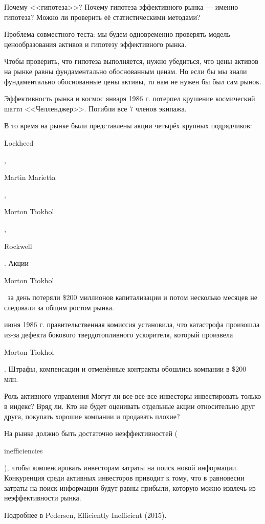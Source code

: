 \documentclass{beamer}
\newcommand{\en}[1]{\begin{otherlanguage}{english}#1\end{otherlanguage}}
\begin{document}
\begin{frame}{Почему <<гипотеза>>?}
\justify
Почему гипотеза эффективного рынка --- именно гипотеза? Можно ли проверить
её статистическими методами?

\justify
Проблема совместного теста: мы будем одновременно проверять модель 
ценообразования активов и гипотезу эффективного рынка.

\justify
Чтобы проверить, что гипотеза выполняется, нужно убедиться, что цены активов
на рынке равны фундаментально обоснованным ценам. Но если бы мы знали 
фундаментально обоснованные цены активы, то нам не нужен бы был сам рынок.
\end{frame}



\begin{frame}{Эффективность рынка и космос}
 января 1986 г. потерпел крушение космический шаттл <<Челленджер>>. Погибли
все 7 членов экипажа.

\justify
В то время на рынке были представлены акции четырёх крупных подрядчиков: 
\en{Lockheed}, \en{Martin Marietta}, \en{Morton Tiokhol}, \en{Rockwell}. Акции
\en{Morton Tiokhol}\ за день потеряли \$200 миллионов капитализации и потом
несколько месяцев не следовали за общим ростом рынка.

 июня 1986 г. правительственная комиссия установила, что катастрофа произошла
из-за дефекта бокового твердотопливного ускорителя, который произвела 
\en{Morton Tiokhol}. Штрафы, компенсации и отменённые контракты обошлись 
компании в \$200 млн.
\end{frame}



\begin{frame}{Роль активного управления}
\justify
Могут ли все-все-все инвесторы инвестировать только в индекс? Вряд ли. Кто же 
будет оценивать отдельные акции относительно друг друга, покупать хорошие 
компании и продавать плохие?

\justify
На рынке должно быть достаточно неэффективностей (\en{inefficiencies}), чтобы 
компенсировать инвесторам затраты на поиск новой информации. Конкуренция среди
активных инвесторов приводит к тому, что в равновесии затраты на поиск 
информации будут равны прибыли, которую можно извлечь из неэффективности рынка.

\justify
Подробнее в Pedersen, Efficiently Inefficient (2015).
\end{frame}
\end{document}
